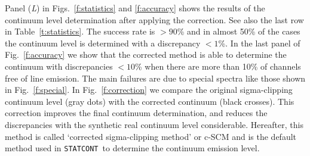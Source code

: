 \documentclass{aa}
\newcommand{\statcont} {\texttt{STATCONT}}
\begin{document}

Panel (\textit{L}) in Figs.~\ref{f:statistics} and \ref{f:accuracy} shows the results of the continuum level determination after applying the correction. See also the last row in Table~\ref{t:statistics}. The success rate is $>90$\% and in almost 50\% of the cases the continuum level is determined with a discrepancy $<1$\%. In the last panel of Fig.~\ref{f:accuracy} we show that the corrected method is able to determine the continuum with discrepancies $<10$\% when there are more than 10\% of channels free of line emission. The main failures are due to special spectra like those shown in Fig.~\ref{f:special}. In Fig.~\ref{f:correction} we compare the original sigma-clipping continuum level (gray dots) with the corrected continuum (black crosses). This correction improves the final continuum determination, and reduces the discrepancies with the synthetic real continuum level considerable. Hereafter, this method is called `corrected sigma-clipping method' or c-SCM and is the default method used in \statcont\ to determine the continuum emission level.
\end{document}

